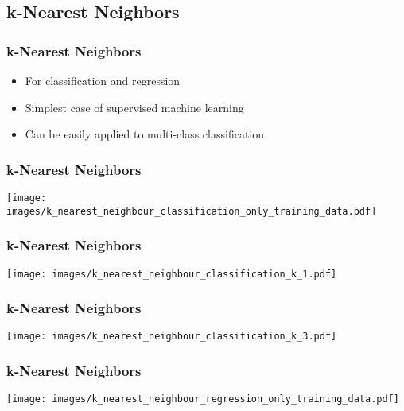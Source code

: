 \documentclass[aspectratio=169]{beamer}
\begin{document}
\subsection{k-Nearest Neighbors}

\setcounter{tocdepth}{2}
\begin{frame}{}
   \tableofcontents[currentsubsection]
\end{frame}

\begin{frame}
  \frametitle{k-Nearest Neighbors}
  \begin{block}{}
    \begin{center}
      \begin{itemize}
      \item For classification and regression
      \item Simplest case of supervised machine learning
      \item Can be easily applied to multi-class classification
      \end{itemize}
    \end{center}
  \end{block}    
\end{frame}

\begin{frame}
  \frametitle{k-Nearest Neighbors}
  \begin{center}
    \texttt{[image: images/k\_nearest\_neighbour\_classification\_only\_training\_data.pdf]}
  \end{center}
\end{frame}

\begin{frame}
  \frametitle{k-Nearest Neighbors}
  \begin{center}
    \texttt{[image: images/k\_nearest\_neighbour\_classification\_k\_1.pdf]}
  \end{center}
\end{frame}

\begin{frame}
  \frametitle{k-Nearest Neighbors}
  \begin{center}
    \texttt{[image: images/k\_nearest\_neighbour\_classification\_k\_3.pdf]}
  \end{center}
\end{frame}

\begin{frame}
  \frametitle{k-Nearest Neighbors}
  \begin{center}
    \texttt{[image: images/k\_nearest\_neighbour\_regression\_only\_training\_data.pdf]}
  \end{center}
\end{frame}
\end{document}
